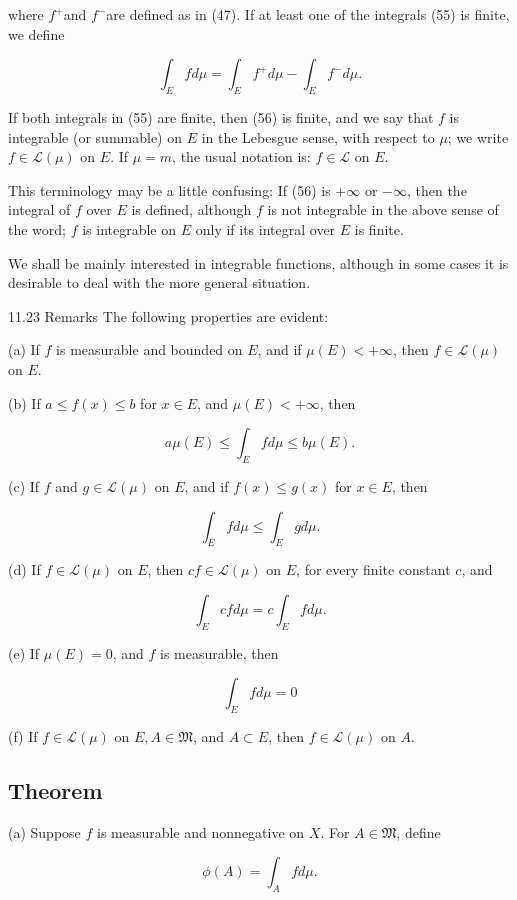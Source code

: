 \documentclass[10pt]{article}
\begin{document}
where $f^{+}$and $f^{-}$are defined as in (47). If at least one of the integrals (55) is finite, we define

$$
\int_{E} f d \mu=\int_{E} f^{+} d \mu-\int_{E} f^{-} d \mu .
$$

If both integrals in (55) are finite, then (56) is finite, and we say that $f$ is integrable (or summable) on $E$ in the Lebesgue sense, with respect to $\mu$; we write $f \in \mathscr{L}(\mu)$ on $E$. If $\mu=m$, the usual notation is: $f \in \mathscr{L}$ on $E$.

This terminology may be a little confusing: If (56) is $+\infty$ or $-\infty$, then the integral of $f$ over $E$ is defined, although $f$ is not integrable in the above sense of the word; $f$ is integrable on $E$ only if its integral over $E$ is finite.

We shall be mainly interested in integrable functions, although in some cases it is desirable to deal with the more general situation.

11.23 Remarks The following properties are evident:

(a) If $f$ is measurable and bounded on $E$, and if $\mu(E)<+\infty$, then $f \in \mathscr{L}(\mu)$ on $E$.

(b) If $a \leq f(x) \leq b$ for $x \in E$, and $\mu(E)<+\infty$, then

$$
a \mu(E) \leq \int_{E} f d \mu \leq b \mu(E) .
$$

(c) If $f$ and $g \in \mathscr{L}(\mu)$ on $E$, and if $f(x) \leq g(x)$ for $x \in E$, then

$$
\int_{E} f d \mu \leq \int_{E} g d \mu .
$$

(d) If $f \in \mathscr{L}(\mu)$ on $E$, then $c f \in \mathscr{L}(\mu)$ on $E$, for every finite constant $c$, and

$$
\int_{E} c f d \mu=c \int_{E} f d \mu .
$$

(e) If $\mu(E)=0$, and $f$ is measurable, then

$$
\int_{E} f d \mu=0
$$

(f) If $f \in \mathscr{L}(\mu)$ on $E, A \in \mathfrak{M}$, and $A \subset E$, then $f \in \mathscr{L}(\mu)$ on $A$.

\subsection{Theorem}
(a) Suppose $f$ is measurable and nonnegative on $X$. For $A \in \mathfrak{M}$, define

$$
\phi(A)=\int_{A} f d \mu .
$$
\end{document}
